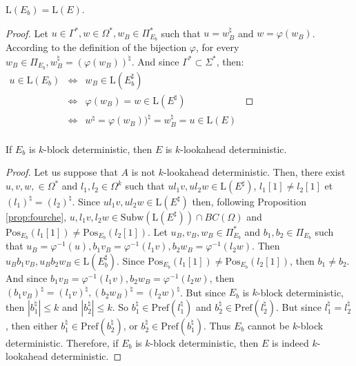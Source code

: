 \documentclass{llncs}
\begin{document}
\begin{proposition}\label{prop:preservationLangage}
	$\mathrm{L}(E_b) = \mathrm{L}(E)$.
\end{proposition}
\begin{proof}
	Let $u \in \Gamma^*, w \in \Omega^*, w_B \in \Pi_{E_b}^*$ such that $u = w_B^{\natural}$ and $w = \varphi(w_B)$.
	According to the definition of the bijection $\varphi$, for every $w_B \in \Pi_{E_b}, w_B^{\natural} = (\varphi(w_B))^{\natural}$.
	And since $\Gamma^* \subset \Sigma^*$, then:\\
	$\begin{array}{ccl}
   		u \in \mathrm{L}(E_b) & \iff & w_B \in \mathrm{L}(E_b^{\sharp})\\
  		& \iff & \varphi(w_B) = w \in \mathrm{L}(E^{\sharp})\\
	  	& \iff & w^{\natural} = \varphi(w_B))^{\natural} = w_B^{\natural} = u \in \mathrm{L}(E)\\
	\end{array}$

\end{proof}

\begin{theorem}\label{th:kbd_kla}
	If $E_b$ is $k$-block deterministic, then $E$ is $k$-lookahead deterministic.
\end{theorem}
\begin{proof}
	Let us suppose that $A$ is not $k$-lookahead deterministic.
	Then, there exist $u, v, w, \in \Omega^*$ and $l_1, l_2 \in \Omega^k$ such that $ul_1v, ul_2w \in \mathrm{L}(E^{\sharp})$, $l_1[1] \neq l_2[1]$ et $(l_1)^{\natural} = (l_2)^{\natural}$.
	Since $ul_1v, ul_2w \in \mathrm{L}(E^{\sharp})$ then, following Proposition \ref{prop:fourche}, $u, l_1v, l_2w \in \mathrm{Subw}(\mathrm{L}(E^{\sharp})) \cap BC(\Omega)$ and $\mathrm{Pos}_{E_b}(l_1[1]) \neq \mathrm{Pos}_{E_b}(l_2[1])$.
	Let $u_B, v_B, w_B \in \Pi_{E_b}^*$ and $b_1, b_2 \in \Pi_{E_b}$ such that $u_B = \varphi^{-1}(u), b_1v_B = \varphi^{-1}(l_1v), b_2w_B = \varphi^{-1}(l_2w)$.
	Then $u_Bb_1v_B, u_Bb_2w_B \in \mathrm{L}(E_b^{\sharp})$.
	Since $\mathrm{Pos}_{E_b}(l_1[1]) \neq \mathrm{Pos}_{E_b}(l_2[1])$, then $b_1 \neq b_2$.
	And since $b_1v_B = \varphi^{-1}(l_1v), b_2w_B = \varphi^{-1}(l_2w)$, then $(b_1v_B)^{\natural} = (l_1v)^{\natural}, (b_2w_B)^{\natural} = (l_2w)^{\natural}$.
	But since $E_b$ is $k$-block deterministic, then $|b_1^{\natural}| \leq k$ and $|b_2^{\natural}| \leq k$.
	So $b_1^{\natural} \in \mathrm{Pref}(l_1^{\natural})$ and $b_2^{\natural} \in \mathrm{Pref}(l_2^{\natural})$.
	But since $l_1^{\natural} = l_2^{\natural}$, then either $b_1^{\natural} \in \mathrm{Pref}(b_2^{\natural})$, or $b_2^{\natural} \in \mathrm{Pref}(b_1^{\natural})$.
	Thus $E_b$ cannot be $k$-block deterministic.
	Therefore, if $E_b$ is $k$-block deterministic, then $E$ is indeed $k$-lookahead deterministic.
\end{proof}
\end{document}
